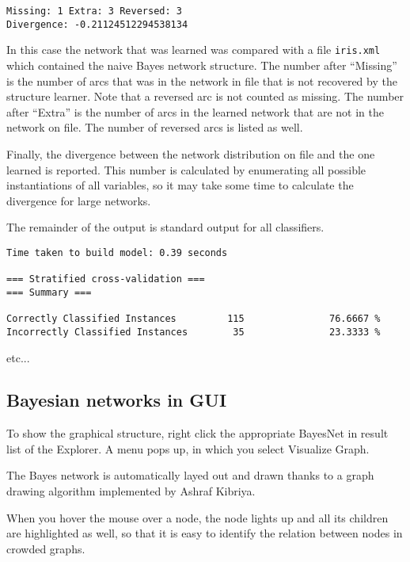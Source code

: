 \documentclass{article}
\begin{document}
\begin{verbatim}
Missing: 1 Extra: 3 Reversed: 3
Divergence: -0.21124512294538134
\end{verbatim}

In this case the network that was learned was compared with a file {\tt iris.xml}
which contained the naive Bayes network structure. The number after ``Missing''
is the number of arcs that was in the network in file that is not recovered by
the structure learner. Note that a reversed arc is not counted as missing.
The number after ``Extra'' is the number of arcs in the learned network that are
not in the network on file. The number of reversed arcs is listed as well.

Finally, the divergence between the network distribution on file and the one learned
is reported. This number is calculated by enumerating all possible instantiations
of all variables, so it may take some time to calculate the divergence for large
networks.

The remainder of the output is standard output for all classifiers. 
\begin{verbatim}
Time taken to build model: 0.39 seconds

=== Stratified cross-validation ===
=== Summary ===

Correctly Classified Instances         115               76.6667 %
Incorrectly Classified Instances        35               23.3333 %
\end{verbatim}
etc...

\subsection*{Bayesian networks in GUI}

To show the graphical structure, right click the appropriate BayesNet in result list of
the Explorer. A menu pops up, in which you select Visualize Graph.

\begin{center}
\end{center}

The Bayes network is automatically layed out and drawn thanks to a graph drawing algorithm
implemented by Ashraf Kibriya.

\begin{center}
\end{center}

When you hover the mouse over a node, the node lights up and all its children are highlighted
as well, so that it is easy to identify the relation between nodes in crowded graphs.
\end{document}
